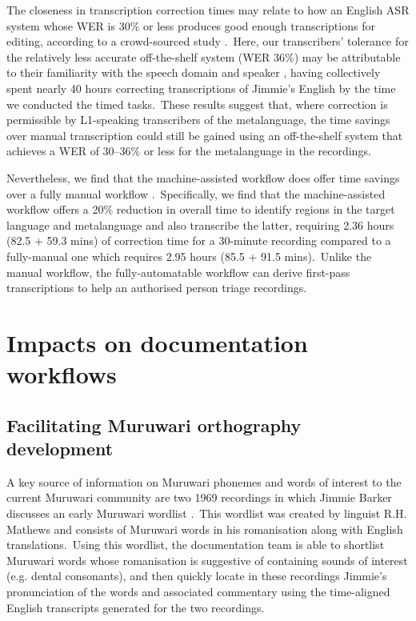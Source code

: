 \documentclass[main.tex]{subfiles}
\begin{document}
The closeness in transcription correction times may relate to how an English ASR system whose WER is 30\% or less produces good enough transcriptions for editing, according to a crowd-sourced study \parencite{gaur2016effects}.~Here, our transcribers' tolerance for the relatively less accurate off-the-shelf system (WER 36\%) may be attributable to their familiarity with the speech domain and speaker \parencite{Sperber2017b}, having collectively spent nearly 40 hours correcting transcriptions of Jimmie's English by the time we conducted the timed tasks.~These results suggest that, where correction is permissible by L1-speaking transcribers of the metalanguage, the time savings over manual transcription could still be gained using an off-the-shelf system that achieves a WER of 30--36\% or less for the metalanguage in the recordings.

Nevertheless, we find that the machine-assisted workflow does offer time savings over a fully manual workflow \parencite[in line with previous work, e.g.:][]{sperber-etal-2016-optimizing,Sperber2017b}.~Specifically, we find that the machine-assisted workflow offers a 20\% reduction in overall time to identify regions in the target language and metalanguage and also transcribe the latter, requiring 2.36 hours (82.5 + 59.3 mins) of correction time for a 30-minute recording compared to a fully-manual one which requires 2.95 hours (85.5 + 91.5 mins).~Unlike the manual workflow, the fully-automatable workflow can derive first-pass transcriptions to help an authorised person triage recordings.

\section{Impacts on documentation workflows}

\subsection{Facilitating Muruwari orthography development}

A key source of information on Muruwari phonemes and words of interest to the current Muruwari community are two 1969 recordings in which Jimmie Barker discusses an early Muruwari wordlist \parencite{mathews1902}.~This wordlist was created by linguist R.H. Mathews and consists of Muruwari words in his romanisation along with English translations.~Using this wordlist, the documentation team is able to shortlist Muruwari words whose romanisation is suggestive of containing sounds of interest (e.g. dental consonants), and then quickly locate in these recordings Jimmie's pronunciation of the words and associated commentary using the time-aligned English transcripts generated for the two recordings.
\end{document}
